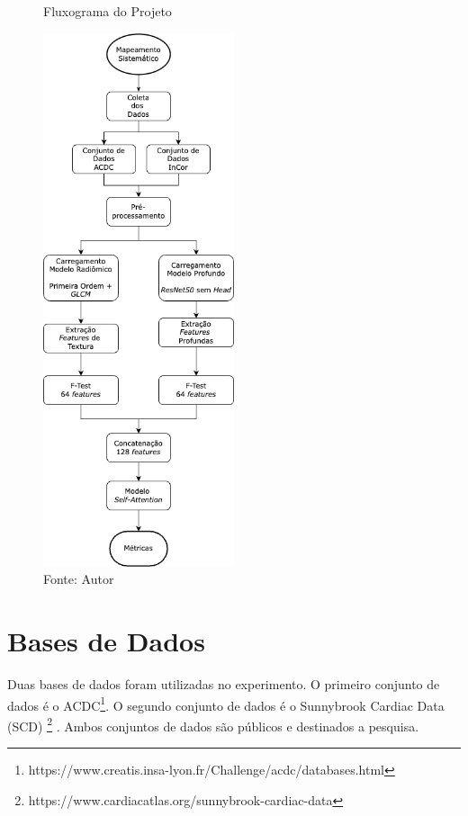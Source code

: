 \begin{figure}[h!]
    \centering
    \caption{Fluxograma do Projeto}
    \includegraphics[width=0.5\textwidth]{figures/fig015.png}
    \caption*{Fonte: Autor}
    \label{fig:fig015}
\end{figure}

\section{Bases de Dados} 
\label{subsec:cap4_dataset}

Duas bases de dados foram utilizadas no experimento. O primeiro conjunto de dados é o \gls{ACDC}\footnote{https://www.creatis.insa-lyon.fr/Challenge/acdc/databases.html}. O segundo conjunto de dados é o Sunnybrook Cardiac Data (SCD) \footnote{https://www.cardiacatlas.org/sunnybrook-cardiac-data} \cite{radauEvaluationFrameworkAlgorithms2009}. Ambos conjuntos de dados são públicos e destinados a pesquisa.

